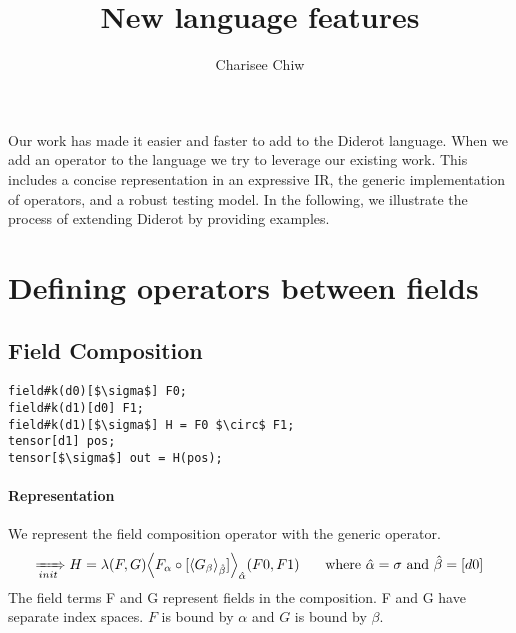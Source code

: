 \documentclass{article}
\title{New language features}
\author{Charisee Chiw}
\begin{document}
\maketitle 
Our work has made it easier and faster to add to the Diderot language.
When we add an operator to the language we try to leverage our existing work.
This includes a concise representation in an expressive IR, the generic implementation of operators, and a robust testing model.
In the following, we illustrate the process of extending Diderot by providing examples.


\section{Defining operators between fields}
\subsection{Field Composition}

\begin{lstlisting}
field#k(d0)[$\sigma$] F0;
field#k(d1)[d0] F1;
field#k(d1)[$\sigma$] H = F0 $\circ$ F1; 
tensor[d1] pos;
tensor[$\sigma$] out = H(pos);
\end{lstlisting}

\paragraph{Representation}
We represent the field composition operator with the generic \name{} operator.
$$\rewriteInitA  H= \lambda(F,G) \EinExp{\expComp{F_\alpha}{G_\beta}{\beta}}{\hat{\alpha}}(F0,F1) \indent\text{ where } \hat{\alpha}=\sigma \text{ and } \hat{\beta} =[d0]$$
The field terms F and G represent fields in the composition.
F and G have separate index spaces. $F$ is bound by $\alpha$ and $G$ is bound by $\beta$.\\
 
\end{document}
